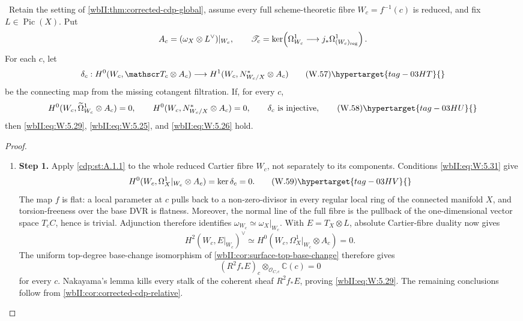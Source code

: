 \begin{theorem}
\hypertarget{tag-03IZ}{}\label{wbII:thm:corrected-cdp-fibrewise}

\ Retain the setting of
\cref{wbII:thm:corrected-cdp-global}, assume every full scheme-theoretic fibre
\(W_c=f^{-1}(c)\) is reduced, and fix \(L\in\operatorname{Pic}(X)\).  Put
\[
 A_c=(\omega_X\otimes L^\vee)|_{W_c},\qquad
 \mathscr T_c=\ker\!\left(
 \Omega^1_{W_c}\longrightarrow
 j_*\Omega^1_{(W_c)_{\rm reg}}\right).
\]
For each \(c\), let
\[
 \delta_c:
 H^0(W_c,\mathscr T_c\otimes A_c)
 \longrightarrow
 H^1(W_c,N^*_{W_c/X}\otimes A_c)
\tag{W.57}\hypertarget{tag-03HT}{}\label{wbII:eq:W:5.30}
\]
be the connecting map from the missing cotangent filtration.  If, for every
\(c\),
\[
 H^0(W_c,\widetilde\Omega^1_{W_c}\otimes A_c)=0,\qquad
 H^0(W_c,N^*_{W_c/X}\otimes A_c)=0,\qquad
 \delta_c\ \text{is injective},
\tag{W.58}\hypertarget{tag-03HU}{}\label{wbII:eq:W:5.31}
\]
then \eqref{wbII:eq:W:5.29}, \eqref{wbII:eq:W:5.25}, and \eqref{wbII:eq:W:5.26} hold.
\end{theorem}



\begin{proof}
\begin{enumerate}[label={$\langle1\rangle$\arabic*.},leftmargin=*]
\item 
\noindent\textbf{Step 1.} Apply \cref{cdp:st:A.1.1} to the whole reduced
Cartier fibre \(W_c\), not separately to its components.  Conditions \eqref{wbII:eq:W:5.31}
give
\[
 H^0(W_c,\Omega_X^1|_{W_c}\otimes A_c)
 =\ker\delta_c=0.
\tag{W.59}\hypertarget{tag-03HV}{}\label{wbII:eq:W:5.32}
\]
The map \(f\) is flat: a local parameter at \(c\) pulls back to a
non-zero-divisor in every regular local ring of the connected manifold \(X\),
and torsion-freeness over the base DVR is flatness.  Moreover, the normal
line of the full fibre is the pullback of the one-dimensional vector space
\(T_cC\), hence is trivial.  Adjunction therefore identifies
\(\omega_{W_c}\simeq\omega_X|_{W_c}\).  With \(E=T_X\otimes L\), absolute
Cartier-fibre duality now gives
\[
 H^2(W_c,E|_{W_c})^\vee
 \simeq H^0(W_c,\Omega_X^1|_{W_c}\otimes A_c)=0.
\]
The uniform top-degree base-change isomorphism of
\cref{wbII:cor:surface-top-base-change} therefore gives
\[
 (R^2f_*E)_c\otimes_{\mathcal O_{C,c}}\mathbb C(c)=0
\]
for every \(c\).  Nakayama's lemma kills every stalk of the coherent sheaf
\(R^2f_*E\), proving \eqref{wbII:eq:W:5.29}.  The remaining conclusions follow from
\cref{wbII:cor:corrected-cdp-relative}.

\end{enumerate}
\end{proof}